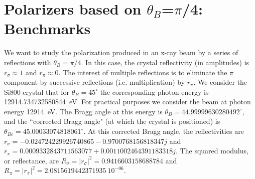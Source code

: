 \documentclass{iucr}
\begin{document}


\section{Polarizers based on $\theta_B$=$\pi$/4: Benchmarks}\label{sec:polarizers45degBenchmark}

We want to study the polarization produced in an x-ray beam by a series of reflections with $\theta_B=\pi/4$. In this case, the crystal reflectivity (in amplitudes) is $r_\sigma \approx 1$ and $r_\pi \approx 0$. The interest of multiple reflections is to eliminate the $\pi$ component by successive reflections (i.e. multiplication) by $r_\pi$. We consider the Si800 crystal that for $\theta_B=45^{\circ}$ the corresponding photon energy is 12914.734732580844~eV. For practical purposes we consider the beam at photon energy 12914~eV. The Bragg angle at this energy is $\theta_B=44.99999630280492^{\circ}$, and the ``corrected Bragg angle" (at which the crystal is positioned) is $\theta_{Bc}=45.00033074818061^{\circ}$. At this corrected Bragg angle, the reflectivities are $r_\sigma=-0.024724229926740865-0.9700768156818347j$ and $r_\pi=0.0009332843711563077+0.0011002464391183318j$. The squared modulus, or reflectance, are $R_\sigma=|r_\sigma|^2=0.9416603158688784$ and 
$R_\pi=|r_\pi|^2=2.0815619442371935~10^{-06}$.
\end{document}
